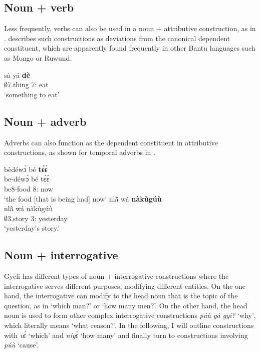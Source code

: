\subsection{Noun + verb}
\label{sec:NV}

Less frequently,  verbs can also be used in a noun + attributive construction, as  in . \citet[224]{velde2013} describes such constructions as deviations from the canonical dependent constituent, which are apparently found frequently in other Bantu languages such as Mongo or Ruwund.

\ea\label{stheat}
  \gll  sá yá {\bfseries dè} \\
           $\emptyset$7.thing 7:{\ATT} eat \\
    \trans `something to eat'
\z


\subsection{Noun + adverb}
\label{sec:NADV}

Adverbs can also function as the dependent constituent in attributive constructions, as shown for temporal adverbs in . 

\ea \label{G2nomx}
  \ea  \label{G2nom1x}
  \glll   bèdéwɔ̀ bé {\bfseries tɛ́ɛ̀} \\
	be-déwɔ̀ bé tɛ́ɛ̀  \\
           be8-food 8:{\ATT} now    \\
    \trans `the food [that is being had] now'
\ex\label{G2nom2x}
 \glll  nlã̂ wá {\bfseries nàkùgúù} \\
	nlã̂ wá nàkùgúù \\
         $\emptyset$3.story 3:{\ATT} yesterday  \\
    \trans `yesterday's story.'
\z
\z




\subsection{Noun + interrogative}
\label{sec:NIntPro}

Gyeli has different types of noun + interrogative constructions where the interrogative serves different purposes, modifying different entities. On the one hand, the interrogative can modify to the head noun that is the topic of the question, as in `which man?' or  `how many men?'. On the other hand, the head noun is used to form other complex interrogative constructions  {\itshape púù yá gyí?} `why', which literally means `what reason?'. In the following, I will outline constructions with {\itshape vɛ́} `which' and {\itshape níyɛ̀} `how many' and finally turn to constructions involving {\itshape púù} `cause'.


